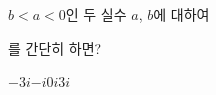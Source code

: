 $b<a<0$인 두 실수 $a$, $b$에 대하여\par\smallskip{}\par\smallskip\noindent 를 간단히 하면?
\begin{choices32}{$-3i$}{$-i$}{$0$}{$i$}{$3i$}\end{choices32}
